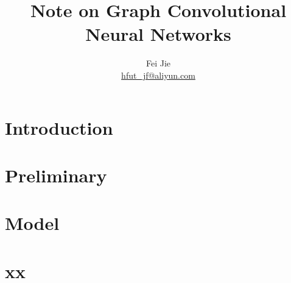 \documentclass{article}
\title{Note on Graph Convolutional Neural Networks}
\author{Fei Jie \\ \href{}{hfut\_jf@aliyun.com}}
\begin{document}
\maketitle
\thispagestyle{firstpage}

\section{Introduction}


\section{Preliminary}


\section{Model}


\section{xx}
\end{document}
